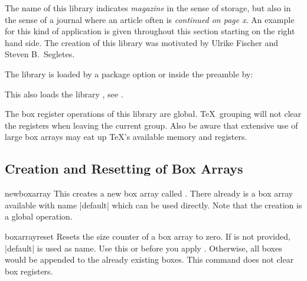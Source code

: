 The name of this library indicates \emph{magazine} in the sense of storage,
but also in the sense of a journal where an article often is \emph{continued on page x}.
An example for this kind of application is given throughout this section starting
on the right hand side. The creation of this library was motivated by
Ulrike Fischer and Steven B.~Segletes.

The library is loaded by a package option or inside the preamble by:
\begin{dispListing}
\end{dispListing}
This also loads the library , see .

\begin{marker}
The box register operations of this library are global. \TeX\ grouping will
not clear the registers when leaving the current group. Also be aware that
extensive use of large box arrays may eat up \TeX's available memory and
registers.
\end{marker}

\subsection{Creation and Resetting of Box Arrays}\label{subsec:magazine_creation}

\begin{docCommand}[doc new=2015-07-13]{newboxarray}{}
  This creates a new box array called . There already is a
  box array available with name |default| which can be used directly.
  Note that the creation is a global operation.
\begin{dispListing}
\end{dispListing}
\end{docCommand}


\begin{docCommand}[doc new=2015-07-13]{boxarrayreset}{}
  Resets the size counter of a box array  to zero.
  If  is not provided, |default| is used as name.
  Use this or  before
  you apply . Otherwise, all boxes would
  be appended to the already existing boxes.
  This command does not clear box registers.
\begin{dispListing}
\boxarrayreset            %
\end{dispListing}
\end{docCommand}

